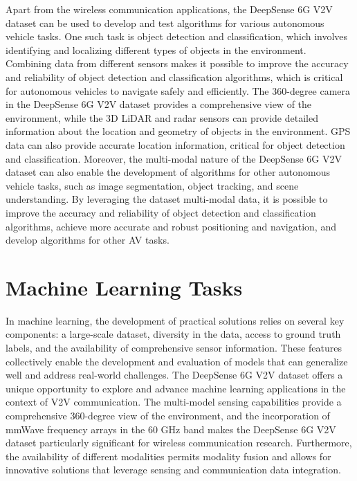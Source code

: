 \documentclass[10pt,comsoc]{IEEEtran}
\begin{document}
Apart from the wireless communication applications, the DeepSense 6G V2V dataset can be used to develop and test algorithms for various autonomous vehicle tasks. One such task is object detection and classification, which involves identifying and localizing different types of objects in the environment. Combining data from different sensors makes it possible to improve the accuracy and reliability of object detection and classification algorithms, which is critical for autonomous vehicles to navigate safely and efficiently. The 360-degree camera in the DeepSense 6G V2V dataset provides a comprehensive view of the environment, while the 3D LiDAR and radar sensors can provide detailed information about the location and geometry of objects in the environment. GPS data can also provide accurate location information, critical for object detection and classification. Moreover, the multi-modal nature of the DeepSense 6G V2V dataset can also enable the development of algorithms for other autonomous vehicle tasks, such as image segmentation, object tracking, and scene understanding. By leveraging the dataset multi-modal data, it is possible to improve the accuracy and reliability of object detection and classification algorithms, achieve more accurate and robust positioning and navigation, and develop algorithms for other AV tasks.

\section{Machine Learning Tasks} \label{sec:ML_tasks}
In machine learning, the development of practical solutions relies on several key components: a large-scale dataset, diversity in the data, access to ground truth labels, and the availability of comprehensive sensor information. These features collectively enable the development and evaluation of models that can generalize well and address real-world challenges. The DeepSense 6G V2V dataset offers a unique opportunity to explore and advance machine learning applications in the context of V2V communication. The multi-model sensing capabilities provide a comprehensive 360-degree view of the environment, and the incorporation of mmWave frequency arrays in the 60 GHz band makes the DeepSense 6G V2V dataset particularly significant for wireless communication research. Furthermore, the availability of different modalities permits modality fusion and allows for innovative solutions that leverage sensing and communication data integration.
\end{document}
